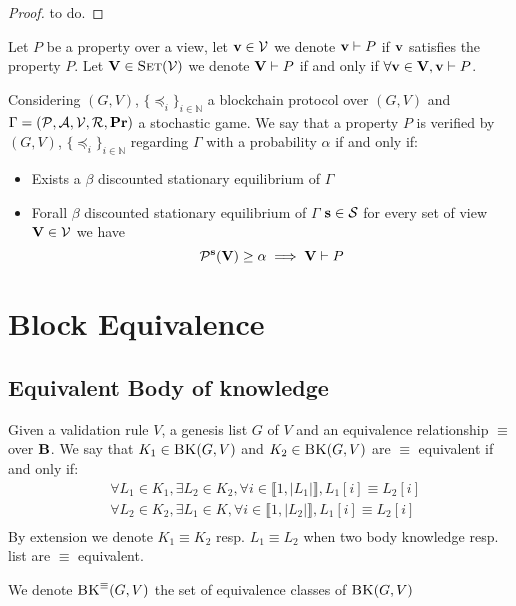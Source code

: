 \begin{proof}
	to do.
\end{proof}

\begin{mydef}
	Let $P$ be a property over a view, let $\mathbf{v} \in \mathcal{V}$ we denote $\mathbf{v} \vdash P$ if $\mathbf{v}$ satisfies the property $P$. Let $\mathbf{V} \in \text{\sc Set}(\mathcal{V})$ we denote $\mathbf{V} \vdash P$ if and only if $\forall \mathbf{v} \in \mathbf{V}, \mathbf{v} \vdash P$.
\end{mydef}

\begin{mydef}
	Considering $(G,V)$, $\{ \preceq_i\}_{i \in \mathbb{N}}$ a blockchain protocol over $(G,V)$ and $\Gamma = (\mathcal{P},\mathcal{A},\mathcal{V},\mathcal{R},\mathbf{Pr})$ a stochastic game. We say that a property $P$ is verified by $(G,V)$, $\{ \preceq_i\}_{i \in \mathbb{N}}$ regarding $\Gamma$ with a probability $\alpha$ if and only if:
	\begin{itemize}
		\item Exists a $\beta$ discounted stationary equilibrium of $\Gamma$ \\
		\item Forall $\beta$ discounted stationary equilibrium of $\Gamma$ $\mathbf{s} \in \mathcal{S} $ for every set of view $\mathbf{V} \in \mathcal{V}$ we have $$\mathcal{P}^{\mathbf{s}}(\mathbf{V}) \geq \alpha \implies \mathbf{V} \vdash  P $$ 
	\end{itemize}
\end{mydef}


\section{Block Equivalence}

\subsection{Equivalent Body of knowledge}

\begin{mydef}
	Given a validation rule $V$, a genesis list $G$ of $V$ and an equivalence relationship $\equiv$ over $\text{\bf B}$. We say that $K_1 \in \text{\sc BK}(G,V)$ and $K_2 \in \text{\sc BK}(G,V)$ are $\equiv$ equivalent if and only if:
	\begin{eqnarray*}
		& \forall L_1 \in K_1, \exists L_2 \in K_2, \forall i \in \llbracket 1,|L_1| \rrbracket, L_1[i] \equiv L_2[i] \\
		& \forall L_2 \in K_2, \exists L_1 \in K, \forall i \in \llbracket 1,|L_2| \rrbracket, L_1[i] \equiv L_2[i] \\
	\end{eqnarray*}	
	By extension we denote $K_1 \equiv K_2$ resp. $L_1 \equiv L_2$ when two body knowledge resp. list are $\equiv$ equivalent.
\end{mydef}
We denote $\text{\sc BK}^\equiv(G,V)$ the set of equivalence classes of $\text{\sc BK}(G,V)$


